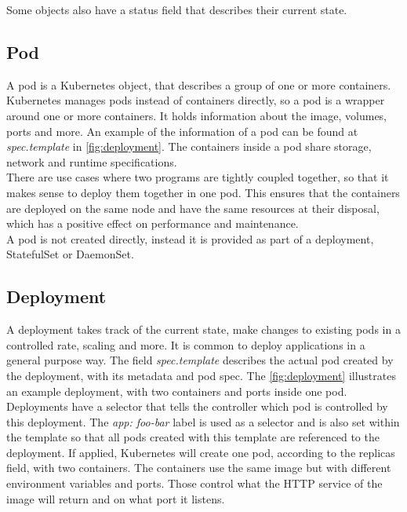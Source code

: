 Some objects also have a status field that describes their current state.~\cite{KUBERNETES-OBJECTS}

\subsection{Pod}
A pod is a Kubernetes object, that describes a group of one or more containers.
Kubernetes manages pods instead of containers directly, so a pod is a wrapper around one or more containers.
It holds information about the image, volumes, ports and more.
An example of the information of a pod can be found at \textit{spec.template} in \autoref{fig:deployment}.
The containers inside a pod share storage, network and runtime specifications.
\\
There are use cases where two programs are tightly coupled together, so that it makes sense to deploy them together in one pod.
This ensures that the containers are deployed on the same node and have the same resources at their disposal, which has a positive effect on performance and maintenance.
\\
A pod is not created directly, instead it is provided as part of a deployment, StatefulSet or DaemonSet.~\cite{KUBERNETES-POD}

\subsection{Deployment}\label{subsec:deployment}

A deployment takes track of the current state, make changes to existing pods in a controlled rate, scaling and more.
It is common to deploy applications in a general purpose way.
The field \textit{spec.template} describes the actual pod created by the deployment, with its metadata and pod spec.
The \autoref{fig:deployment} illustrates an example deployment, with two containers and ports inside one pod.
Deployments have a selector that tells the controller which pod is controlled by this deployment.
The \textit{app: foo-bar} label is used as a selector and is also set within the template so that all pods created with this template are referenced to the deployment.
If applied, Kubernetes will create one pod, according to the replicas field, with two containers.
The containers use the same image but with different environment variables and ports.
Those control what the HTTP service of the image will return and on what port it listens.~\cite{KUBERNETES-DEPLOYMENT}


